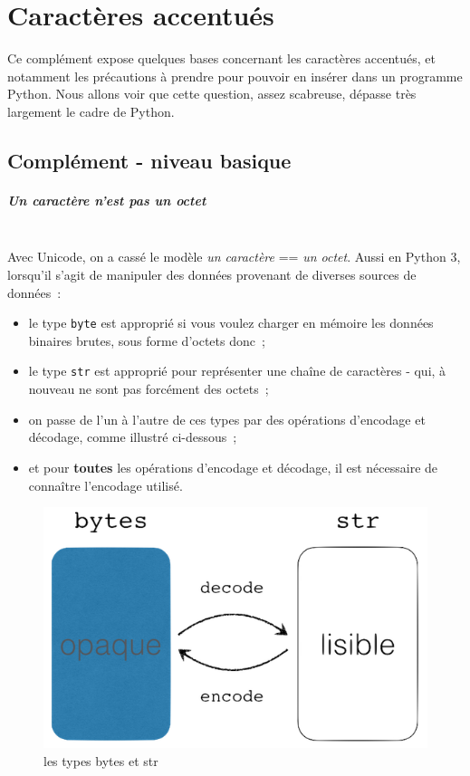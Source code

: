    \hypertarget{caractuxe8res-accentuuxe9s}{%
\section{Caractères accentués}\label{caractuxe8res-accentuuxe9s}}

    Ce complément expose quelques bases concernant les caractères accentués,
et notamment les précautions à prendre pour pouvoir en insérer dans un
programme Python. Nous allons voir que cette question, assez scabreuse,
dépasse très largement le cadre de Python.

    \hypertarget{compluxe9ment---niveau-basique}{%
\subsection{Complément - niveau
basique}\label{compluxe9ment---niveau-basique}}

    \hypertarget{un-caractuxe8re-nest-pas-un-octet}{%
\subparagraph{Un caractère n'est pas un
octet\\\\}\label{un-caractuxe8re-nest-pas-un-octet}}

    Avec Unicode, on a cassé le modèle \emph{un caractère} == \emph{un
octet}. Aussi en Python 3, lorsqu'il s'agit de manipuler des données
provenant de diverses sources de données~:

\begin{itemize}
	\item
	le type \texttt{byte} est
	approprié si vous voulez charger en mémoire les données binaires brutes,
	sous forme d'octets donc~;
	\item
	le type \texttt{str} est approprié pour
	représenter une chaîne de caractères - qui, à nouveau ne sont pas
	forcément des octets~;
	\item
	on passe de l'un à l'autre de ces types par des
	opérations d'encodage et décodage, comme illustré ci-dessous~;
	\item
	et pour \textbf{toutes} les opérations d'encodage et décodage, il est nécessaire
	de connaître l'encodage utilisé.
\end{itemize}

\begin{figure}[h!]
\centering
\includegraphics{medias/str-bytes.png}
\caption{les types bytes et str}
\end{figure}

